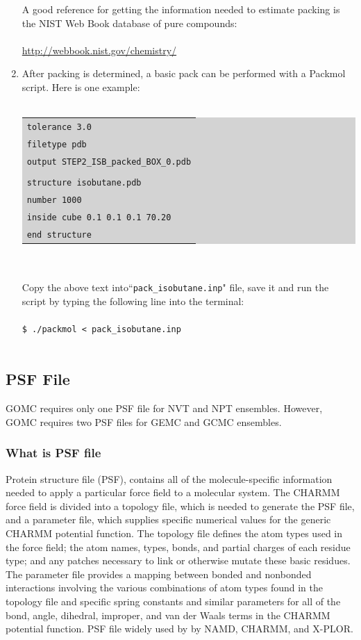 \begin{enumerate}
A good reference for getting the information needed to estimate packing is the NIST Web Book database of pure compounds:\\\\
\url{http://webbook.nist.gov/chemistry/}\\
\item After packing is determined, a basic pack can be performed with a Packmol script.  Here is one example:\\\\
\colorbox{lightgray}{
\begin{tabular}{l}
\texttt{tolerance 3.0}\\
\texttt{filetype pdb}\\
\texttt{output STEP2\_ISB\_packed\_BOX\_0.pdb}\\\\
\texttt{structure isobutane.pdb}\\
\texttt{number 1000}\\
\texttt{inside cube        0.1  0.1  0.1  70.20}\\
\texttt{end structure}
\end{tabular}
}\\\\

Copy the above text into``\texttt{pack\_isobutane.inp}" file, save it and run the script by typing the following line into the terminal:\\\\
\texttt{\$ ./packmol < pack\_isobutane.inp}\\\\
\end{enumerate}

\subsection{PSF File}
GOMC requires only one PSF file for NVT and NPT ensembles. However, GOMC requires two PSF files for GEMC and GCMC ensembles.

\subsubsection{What is PSF file}
Protein structure file (PSF), contains all of the molecule-specific information needed to apply a particular force field to a molecular system. The CHARMM force field is divided into a topology file, which is needed to generate the PSF file, and a parameter file, which supplies specific numerical values for the generic CHARMM potential function. The topology file defines the atom types used in the force field; the atom names, types, bonds, and partial charges of each residue type; and any patches necessary to link or otherwise mutate these basic residues. The parameter file provides a mapping between bonded and nonbonded interactions involving the various combinations of atom types found in the topology file and specific spring constants and similar parameters for all of the bond, angle, dihedral, improper, and van der Waals terms in the CHARMM potential function. PSF file widely used by by NAMD, CHARMM, and X-PLOR.\\\\

